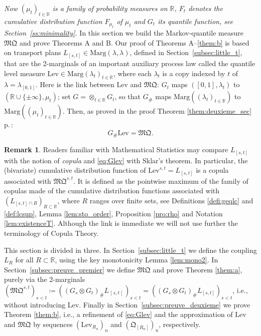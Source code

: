 \documentclass[11pt]{article}
\newcommand{\ie}{i.e.,\xspace}
\theoremstyle{plain}
\theoremstyle{definition}
\newtheorem{rem}[them]{Remark}
\newcommand{\como}{\mathfrak{Q}}
\newcommand{\mq}{\mathfrak{MQ}}
\newcommand{\lev}{\mathrm{Lev}}
\newcommand{\eqdef}{\coloneqq}
\newcommand{\la}{\lambda}
\newcommand{\ma}{\mathrm{Marg}}
\newcommand{\R}{\mathbb{R}}
\newcommand{\op}{\mathopen}
\newcommand{\clo}{\mathclose}
\begin{document}
\emph{Now $(\mu_t)_{t\in \R}$ is a family of probability measures on $\R$, $F_t$ denotes the cumulative distribution function $F_{\mu_t}$ of $\mu_t$ and $G_t$ its quantile function, see Section~\ref{ss:minimality}.} In this section we build the Markov-quantile measure $\mq$ and prove Theorems A and B. Our proof of Theorems A--\ref{them:b} is based on transport plans $L_{[s,t]}\in \ma(\la,\la)$, defined in Section~\ref{subsec:little_t}, that are the 2-marginals of an important auxiliary process law called the quantile level measure $\lev\in\ma(\la_t)_{t\in\R}$, where each $\lambda_t$ is a copy indexed by $t$ of $\la=\la_{[0,1]}$. Here is the link between $\lev$ and $\mq$: $G_t$ maps $([0,1],\la_t)$ to $(\R\cup\{\pm \infty\},\mu_t)$; set $G=\otimes_{t\in\R}G_t$, so that $G_\#$ maps $\ma((\lambda_t)_{t\in\R})$ to $\ma((\mu_t)_{t\in\R})$. Then, as proved in the proof Theorem \ref{them:deuxieme_sec} p.\,\pageref{lieu_preuve_glev}:\vspace*{-3pt}
\begin{equation}\label{eq:Glev}
G_\#\lev=\mq.
\end{equation}

\begin{rem}
Readers familiar with Mathematical Statistics may compare $L_{[s,t]}$ with the notion of \emph{copula} and \eqref{eq:Glev} with Sklar's theorem. In particular, the (bivariate) cumulative distribution function of $\lev^{s,t}=L_{[s,t]}$ is a copula associated with $\mq^{s,t}$. It is defined as the pointwise maximum of the family of copulas made of the cumulative distribution functions associated with $(L_{[s,t]\cap R})_{R\subset \R}$, where $R$ ranges over finite sets, see Definitions \ref{defi:geqlc} and \ref{def:lcsup}, Lemma \ref{lem:sto_order}, Proposition \ref{pro:rho} and Notation \ref{lem:existenceT}. Although the link is immediate we will not use further the terminology of Copula Theory.
\end{rem}

This section is divided in three. In Section~\ref{subsec:little_t} we define the coupling $L_R$ for all $R\subset \R$, using the key monotonicity Lemma \ref{lem:mono2}. In Section~\ref{subsec:preuve_premier} we define $\mq$ and prove Theorem \ref{them:a}, purely via the 2-marginals $(\mq^{s,t})_{s<t}\eqdef((G_s\otimes G_t)_\#L_{\op]s,t\clo[})_{s<t}=((G_s\otimes G_t)_\#L_{[s,t]})_{s<t}$, \ie without introducing $\lev$. Finally in Section~\ref{subsec:preuve_deuxieme} we prove Theorem \ref{them:b}, \ie a refinement of \eqref{eq:Glev} and the approximation of $\lev$ and $\mq$ by sequences $(\lev_{R_n})_n$ and $(\como_{[R_n]})_n$, respectively.
\end{document}
